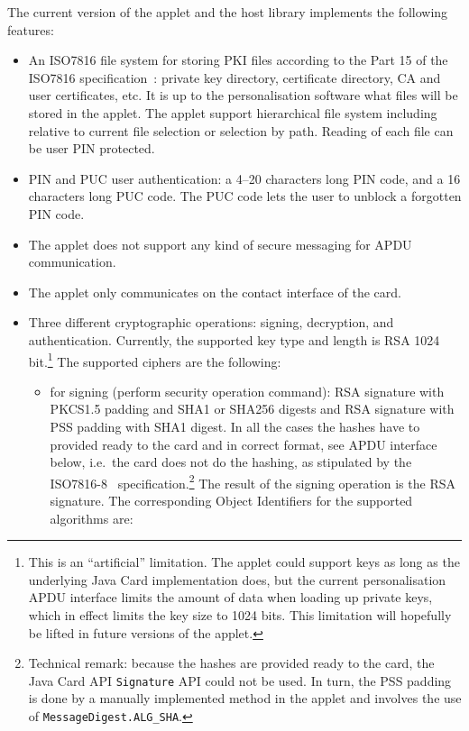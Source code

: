\documentclass{article}
\begin{document}
The current version of the applet and the host library implements the
following features:
\begin{itemize}
\item An ISO7816 file system for storing PKI files according to the Part 15
of the ISO7816 specification~\cite{ISO15}: private key directory, certificate directory, CA and user certificates, etc.
It is up to the personalisation software what files will be stored in the applet.
The applet support hierarchical file system including relative to current file selection or
selection by path. Reading of each file can be user PIN protected.
\item PIN and PUC user authentication: a 4--20 characters long PIN code, and a 16 characters
long PUC code. The PUC code lets the user to unblock a forgotten PIN code.
\item The applet does not support any kind of secure messaging for APDU communication.
\item The applet only communicates on the contact interface of the card.
\item Three different cryptographic operations: signing, decryption, and authentication.
Currently, the supported key type and length is RSA 1024 bit.\footnote{This is an ``artificial'' limitation.
The applet could support
keys as long as the underlying Java Card implementation does, but the current personalisation APDU interface limits the 
amount of data when loading up private keys, which in effect limits the key size to 1024 bits. This limitation will
hopefully be lifted in future versions of the applet.} The supported ciphers are the following:
\begin{itemize}
\item for signing (perform security operation command): RSA signature with PKCS1.5 padding and SHA1 or SHA256 digests and RSA signature 
with PSS padding with SHA1 digest.
In all the cases the hashes have to provided ready to the card and in correct format, see APDU interface below,
i.e.\ the card does not do the hashing, as stipulated by the ISO7816-8~\cite{ISO8} specification.\footnote{%
Technical remark: because the hashes are provided ready to the card, the Java Card API \texttt{Signature} API
could not be used. In turn, the PSS padding is done by a manually implemented method in the applet and involves the 
use of \texttt{MessageDigest.ALG\_SHA}.} The result of the signing operation is the RSA signature.
The corresponding Object Identifiers
for the supported algorithms are:
\begin{itemize}

\end{itemize}
\end{itemize}
\end{itemize}
\end{document}
